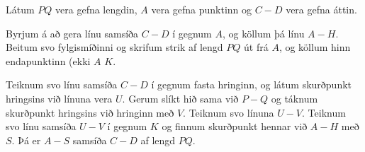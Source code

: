 \begin{frame}
  \begin{hogrsmid} \label{hogrsmid:strikiatt}
    Látum \(PQ\) vera gefna lengdin, \(A\) vera gefna punktinn og
    \(C-D\) vera gefna áttin.

    Byrjum á að gera línu samsíða \(C-D\) í gegnum \(A\), og köllum þá línu
    \(A-H\).
    Beitum svo fylgismíðinni og skrifum strik af lengd \(PQ\) út frá \(A\),
    og köllum hinn endapunktinn (ekki \(A\) \(K\).

    Teiknum svo línu samsíða \(C-D\) í gegnum fasta hringinn, og látum skurðpunkt hringsins
    við línuna vera \(U\). Gerum slíkt hið sama við \(P-Q\) og táknum skurðpunkt
    hringsins við hringinn með \(V\). Teiknum svo línuna \(U-V\). Teiknum
    svo línu samsíða \(U-V\) í gegnum \(K\) og finnum skurðpunkt hennar við
    \(A-H\) með \(S\). Þá er \(A-S\) samsíða \(C-D\) af lengd \(PQ\).
  \end{hogrsmid}
\end{frame}


